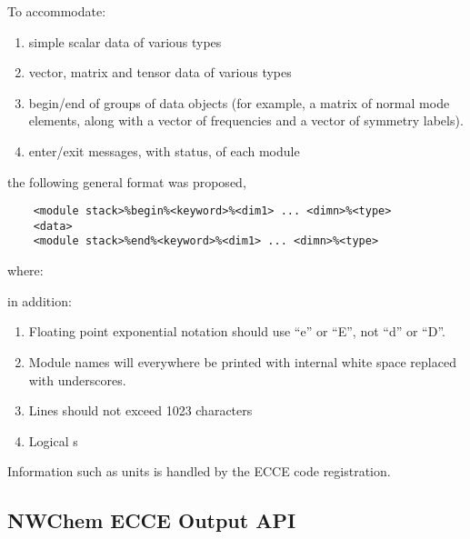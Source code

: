 To accommodate:
\begin{enumerate}
\item simple scalar data of various types
\item vector, matrix and tensor data of various types
\item begin/end of groups of data objects (for example, a matrix of
  normal mode elements, along with a vector of frequencies and a
  vector of symmetry labels).
\item enter/exit messages, with status, of each module
\end{enumerate}
the following general format was proposed,
\begin{verbatim}
    <module stack>%begin%<keyword>%<dim1> ... <dimn>%<type>
    <data>
    <module stack>%end%<keyword>%<dim1> ... <dimn>%<type>
\end{verbatim}
where:
in addition:
\begin{enumerate}
\item Floating point exponential  notation should  use ``e'' or ``E'', 
  not ``d'' or ``D''.
\item Module names will everywhere be printed with internal white space
  replaced with underscores.
\item Lines should not exceed 1023 characters
\item Logical s
\end{enumerate}

Information such as units is handled by the ECCE code registration.

\subsection{NWChem ECCE Output API}

